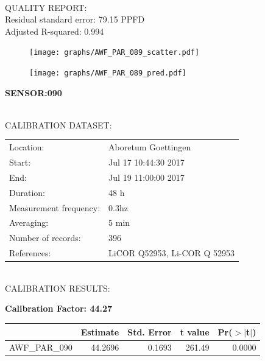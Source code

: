 \documentclass[oneside]{report}
\begin{document}
\hrulefill\\
QUALITY REPORT:\\
Residual standard error: 79.15 PPFD\\
Adjusted R-squared: 0.994



\begin{figure}[H]
  \centering
  \texttt{[image: graphs/AWF\_PAR\_089\_scatter.pdf]}
\end{figure}




\begin{figure}[H]
  \centering
  \texttt{[image: graphs/AWF\_PAR\_089\_pred.pdf]}
\end{figure}

\pagebreak


\begin{center}
\large{\textbf{SENSOR:090}}\\
\end{center}

\hrulefill\\
CALIBRATION DATASET:\\
\begin{table}[h!]
  \centering
  \label{tab:table1}
  \begin{tabular}{ll}
    Location: & Aboretum Goettingen\\ 
    
    
    Start:  & Jul 17 10:44:30 2017 \\
    End:   & Jul 19 11:00:00 2017\\ 
    Duration: & 48 h\\
    Measurement frequency: & 0.3hz\\
    Averaging:  &5 min\\
    Number of records: & 396 \\
    References: & LiCOR Q52953, Li-COR Q 52953 \\
  \end{tabular}
\end{table}

\hrulefill\\
CALIBRATION RESULTS:\\


\begin{center}
\textbf{\large{Calibration Factor: 44.27}}\\
\end{center}
\begin{table}[ht]
\centering
\begin{tabular}{rrrrr}
  \hline
 & Estimate & Std. Error & t value & Pr($>$$|$t$|$) \\ 
  \hline
AWF\_PAR\_090 & 44.2696 & 0.1693 & 261.49 & 0.0000 \\ 
   \hline
\end{tabular}
\end{table}
\end{document}
